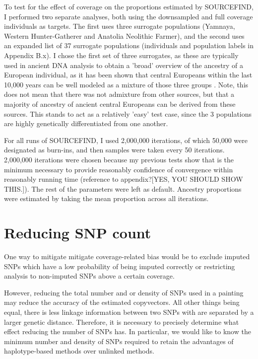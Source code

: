 To test for the effect of coverage on the proportions estimated by SOURCEFIND, I performed two separate analyses, both using the downsampled and full coverage individuals as targets. The first uses three surrogate populations (Yamnaya, Western Hunter-Gatherer and Anatolia Neolithic Farmer), and the second uses an expanded list of 37 surrogate populations (individuals and population labels in Appendix B.x). I chose the first set of three surrogates, as these are typically used in ancient DNA analysis to obtain a 'broad' overview of the ancestry of a European individual, as it has been shown that central Europeans within the last 10,000 years can be well modeled as a mixture of those three groups \cite{Lazaridis2014, Haak2015}. Note, this does not mean that there was not admixture from other sources, but that a majority of ancestry of ancient central Europeans can be derived from these sources. This stands to act as a relatively 'easy' test case, since the 3 populations are highly genetically differentiated from one another.

For all runs of SOURCEFIND, I used 2,000,000 iterations, of which 50,000 were designated as burn-ins, and then samples were taken every 50 iterations. 2,000,000 iterations were chosen because my previous tests show that is the minimum necessary to provide reasonably confidence of convergence within reasonably running time (reference to appendix?{\color{red}[YES, YOU SHOULD SHOW THIS.]}). The rest of the parameters were left as default. Ancestry proportions were estimated by taking the mean proportion across all iterations. 

\section{Reducing SNP count}

One way to mitigate mitigate coverage-related bias would be to exclude imputed SNPs which have a low probability of being imputed correctly or restricting analysis to non-imputed SNPs above a certain coverage.

However, reducing the total number and or density of SNPs used in a painting may reduce the accuracy of the estimated copyvectors. All other things being equal, there is less linkage information between two SNPs with are separated by a larger genetic distance. Therefore, it is necessary to precisely determine what effect reducing the number of SNPs has. In particular, we would like to know the minimum number and density of SNPs required to retain the advantages of haplotype-based methods over unlinked methods. 

